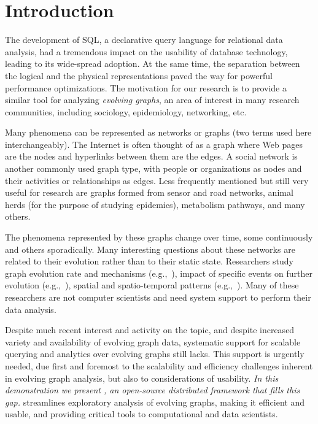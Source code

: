 \section{Introduction}
\label{sec:intro}

The development of SQL, a declarative query language for relational
data analysis, had a tremendous impact on the usability of database
technology, leading to its wide-spread adoption.  At the same time,
the separation between the logical and the physical representations
paved the way for powerful performance optimizations.  The motivation
for our research is to provide a similar tool for analyzing {\em
  evolving graphs}, an area of interest in many research communities,
including sociology, epidemiology, networking, etc.

Many phenomena can be represented as networks or graphs (two terms
used here interchangeably).  The Internet is often thought of as a
graph where Web pages are the nodes and hyperlinks between them are
the edges.  A social network is another commonly used graph type, with
people or organizations as nodes and their activities or relationships
as edges.  Less frequently mentioned but still very useful for
research are graphs formed from sensor and road networks, animal herds
(for the purpose of studying epidemics), metabolism pathways, and many
others.

The phenomena represented by these graphs change over time, some
continuously and others sporadically.  Many interesting questions
about these networks are related to their evolution rather than to
their static state.  Researchers study graph evolution rate and
mechanisms (e.g.,~\cite{DBLP:journals/csur/AggarwalS14,Cho2000}),
impact of specific events on further evolution
(e.g.,~\cite{Chan2008}), spatial and spatio-temporal patterns
(e.g.,~\cite{Lahiri2008}).  Many of these researchers are not computer
scientists and need system support to perform their data analysis.

Despite much recent interest and activity on the topic, and despite
increased variety and availability of evolving graph data, systematic
support for scalable querying and analytics over evolving graphs still
lacks. This support is urgently needed, due first and foremost to the
scalability and efficiency challenges inherent in evolving graph
analysis, but also to considerations of usability.  {\em In this
  demonstration we present \ql, an open-source distributed framework
  that fills this gap.} \ql streamlines exploratory analysis of
evolving graphs, making it efficient and usable, and providing
critical tools to computational and data scientists.

